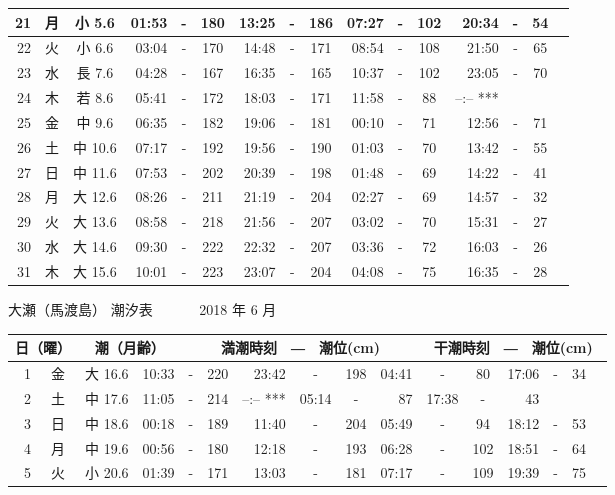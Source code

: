 \documentclass[12pt.a4j]{jsarticle}
\begin{document}
\begin{center}
\begin{table}[ht]
\begin{tabular}{|rc|cr|ccrccr|ccrccr|}
\hline
21 & 月 & 小  5.6 & 01:53 &-& 180 & 13:25 &-& 186 & 07:27 &-& 102 & 20:34 &-&  54 \\
\hline
22 & 火 & 小  6.6 & 03:04 &-& 170 & 14:48 &-& 171 & 08:54 &-& 108 & 21:50 &-&  65 \\
\hline
23 & 水 & 長  7.6 & 04:28 &-& 167 & 16:35 &-& 165 & 10:37 &-& 102 & 23:05 &-&  70 \\
\hline
24 & 木 & 若  8.6 & 05:41 &-& 172 & 18:03 &-& 171 & 11:58 &-&  88 & --:--   *** \\
\hline
25 & 金 & 中  9.6 & 06:35 &-& 182 & 19:06 &-& 181 & 00:10 &-&  71 & 12:56 &-&  71 \\
\hline
26 & 土 & 中 10.6 & 07:17 &-& 192 & 19:56 &-& 190 & 01:03 &-&  70 & 13:42 &-&  55 \\
\hline
27 & 日 & 中 11.6 & 07:53 &-& 202 & 20:39 &-& 198 & 01:48 &-&  69 & 14:22 &-&  41 \\
\hline
28 & 月 & 大 12.6 & 08:26 &-& 211 & 21:19 &-& 204 & 02:27 &-&  69 & 14:57 &-&  32 \\
\hline
29 & 火 & 大 13.6 & 08:58 &-& 218 & 21:56 &-& 207 & 03:02 &-&  70 & 15:31 &-&  27 \\
\hline
30 & 水 & 大 14.6 & 09:30 &-& 222 & 22:32 &-& 207 & 03:36 &-&  72 & 16:03 &-&  26 \\
\hline
31 & 木 & 大 15.6 & 10:01 &-& 223 & 23:07 &-& 204 & 04:08 &-&  75 & 16:35 &-&  28 \\
\hline
\end{tabular}
\end{table}
\newpage
 {\LARGE 大瀬（馬渡島）  潮汐表　　　}
 {\large 2018 年  6 月}\\
 \begin{table}[ht]
 \begin{tabular}{|rc|cr|ccrccr|ccrccr|}
 \hline
 \multicolumn{2}{|c|}{日（曜）} & \multicolumn{2}{c|}{潮（月齢）} & \multicolumn{6}{c|}{満潮時刻　―　潮位(cm)} & \multicolumn{6}{c|}{干潮時刻　―　潮位(cm)} \\
 \hline
 1 & 金 & 大 16.6 & 10:33 &-& 220 & 23:42 &-& 198 & 04:41 &-&  80 & 17:06 &-&  34 \\
\hline
 2 & 土 & 中 17.6 & 11:05 &-& 214 & --:--   *** & 05:14 &-&  87 & 17:38 &-&  43 \\
\hline
 3 & 日 & 中 18.6 & 00:18 &-& 189 & 11:40 &-& 204 & 05:49 &-&  94 & 18:12 &-&  53 \\
\hline
 4 & 月 & 中 19.6 & 00:56 &-& 180 & 12:18 &-& 193 & 06:28 &-& 102 & 18:51 &-&  64 \\
\hline
 5 & 火 & 小 20.6 & 01:39 &-& 171 & 13:03 &-& 181 & 07:17 &-& 109 & 19:39 &-&  75 \\

\end{tabular}
\end{table}
\end{center}
\end{document}
